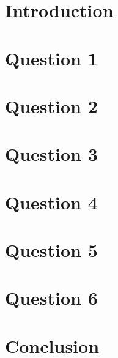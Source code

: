 \documentclass{article}
\begin{document}
\begin{titlepage}

\end{titlepage}
\section{Introduction}

\section{Question 1}

\section{Question 2}

\section{Question 3}

\section{Question 4}

\section{Question 5}

\section{Question 6}

\section{Conclusion}

\end{document}
